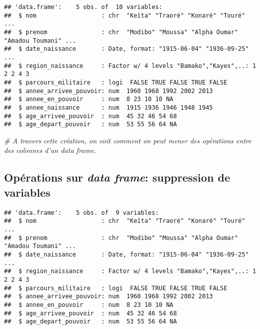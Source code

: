 \documentclass[]{book}
\newenvironment{Shaded}{\begin{snugshade}}{\end{snugshade}}
\newcommand{\KeywordTok}[1]{\textcolor[rgb]{0.13,0.29,0.53}{\textbf{#1}}}
\newcommand{\StringTok}[1]{\textcolor[rgb]{0.31,0.60,0.02}{#1}}
\newcommand{\CommentTok}[1]{\textcolor[rgb]{0.56,0.35,0.01}{\textit{#1}}}
\newcommand{\OtherTok}[1]{\textcolor[rgb]{0.56,0.35,0.01}{#1}}
\newcommand{\OperatorTok}[1]{\textcolor[rgb]{0.81,0.36,0.00}{\textbf{#1}}}
\newcommand{\NormalTok}[1]{#1}
\begin{document}
\begin{verbatim}
## 'data.frame':    5 obs. of  10 variables:
##  $ nom                  : chr  "Keïta" "Traoré" "Konaré" "Touré" ...
##  $ prenom               : chr  "Modibo" "Moussa" "Alpha Oumar" "Amadou Toumani" ...
##  $ date_naissance       : Date, format: "1915-06-04" "1936-09-25" ...
##  $ region_naissance     : Factor w/ 4 levels "Bamako","Kayes",..: 1 2 2 4 3
##  $ parcours_militaire   : logi  FALSE TRUE FALSE TRUE FALSE
##  $ annee_arrivee_pouvoir: num  1960 1968 1992 2002 2013
##  $ annee_en_pouvoir     : num  8 23 10 10 NA
##  $ annee_naissance      : num  1915 1936 1946 1948 1945
##  $ age_arrivee_pouvoir  : num  45 32 46 54 68
##  $ age_depart_pouvoir   : num  53 55 56 64 NA
\end{verbatim}

\begin{Shaded}
\begin{Highlighting}[]
\CommentTok{# A travers cette création, on voit comment on peut mener des opérations entre des colonnes d'un data frame.}
\end{Highlighting}
\end{Shaded}

\normalsize

\subsection{\texorpdfstring{Opérations sur \emph{data frame}:
suppression de
variables}{Opérations sur data frame: suppression de variables}}\label{operations-sur-data-frame-suppression-de-variables}

\tiny

\begin{Shaded}
\end{Shaded}

\begin{verbatim}
## 'data.frame':    5 obs. of  9 variables:
##  $ nom                  : chr  "Keïta" "Traoré" "Konaré" "Touré" ...
##  $ prenom               : chr  "Modibo" "Moussa" "Alpha Oumar" "Amadou Toumani" ...
##  $ date_naissance       : Date, format: "1915-06-04" "1936-09-25" ...
##  $ region_naissance     : Factor w/ 4 levels "Bamako","Kayes",..: 1 2 2 4 3
##  $ parcours_militaire   : logi  FALSE TRUE FALSE TRUE FALSE
##  $ annee_arrivee_pouvoir: num  1960 1968 1992 2002 2013
##  $ annee_en_pouvoir     : num  8 23 10 10 NA
##  $ age_arrivee_pouvoir  : num  45 32 46 54 68
##  $ age_depart_pouvoir   : num  53 55 56 64 NA
\end{verbatim}
\end{document}
